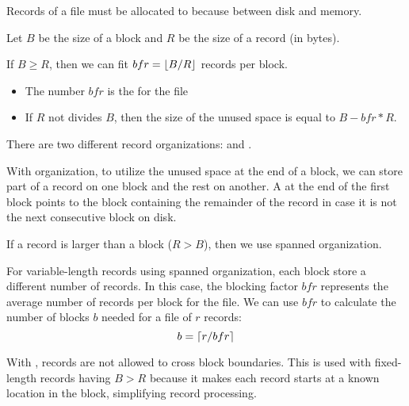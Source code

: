     \par Records of a file must be allocated to  because  between disk and memory.
    \par Let $B$ be the size of a block and $R$ be the size of a record (in bytes).
    \par If $B \geq R$, then we can fit $bfr = \lfloor B / R\rfloor$ records per block.
    \begin{itemize}
      \item The number $bfr$ is the  for the file
      \item If $R$ not divides $B$, then the size of the unused space is equal to $B - bfr * R$.
    \end{itemize}

    \par There are two different record organizations:  and .


      \par With  organization, to utilize the unused space at the end of a block, we can store part of a record on one block and the rest on another. A  at the end of the first block points to the block containing the remainder of the record in case it is not the next consecutive block on disk.
      \par If a record is larger than a block ($R > B$), then we  use spanned organization.
      \par For variable-length records using spanned organization, each block store a different number of records. In this case, the blocking factor $bfr$ represents the average number of records per block for the file. We can use $bfr$ to calculate the number of blocks $b$ needed for a file of $r$ records:
      \[
        b = \lceil r / bfr\rceil
      \]

      \par With , records are not allowed to cross block boundaries. This is used with fixed-length records having $B > R$ because it makes each record starts at a known location in the block, simplifying record processing.

